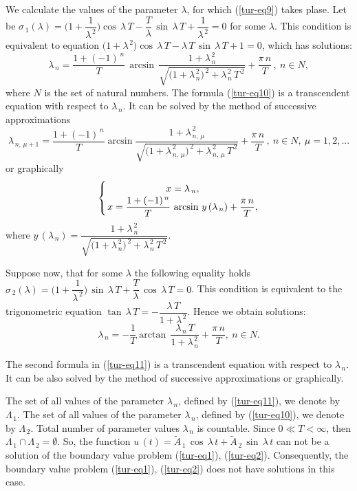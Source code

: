 ﻿\documentclass[
11pt,%
tightenlines,%
twoside,%
onecolumn,%
nofloats,%
nobibnotes,%
nofootinbib,%
superscriptaddress,%
noshowpacs,%
centertags]%
{revtex4}
\begin{document}
We calculate the values of the parameter  $\lambda$, for which (\ref{tur-eq9}) takes plase. Let be $\sigma_{\, 1 } (\lambda)=\Big(1+\dfrac{1}{\lambda^{\, 2}} \Big) \cos \, \lambda \, T- \dfrac{T}{\lambda} \, \sin \, \lambda \, T+\dfrac{1}{\lambda^{\, 2}}= 0 $ for some $\lambda$.  This condition is equivalent to equation $\big(1+\lambda^{\, 2} \big) \cos \, \lambda \, T- \lambda \, T \, \sin \, \lambda \, T+1=0$, which has solutions:
\begin{equation} \label{tur-eq10}
\lambda_{\, n}=\dfrac{1+(-1)^{\, n}}{T} \, \arcsin \, \dfrac{1+\lambda_{\, n}^{\, 2}}{\sqrt{\big( 1+\lambda_{\, n}^{\, 2} \big)^{\, 2}+\lambda_{\, n}^{\, 2} \, T^{\, 2}}}+\dfrac{\pi \, n}{T} \, , \: n \in N , 
\end{equation}
where $N$ is the set of natural numbers. The formula (\ref{tur-eq10}) is a transcendent equation with respect to  $\lambda_{\, n}$. It can be solved by the method of successive approximations  
\[
\lambda_{\, n , \, \mu+1}=\dfrac{1+(-1)^{\, n}}{T} \arcsin \dfrac{1+\lambda_{\, n , \, \mu}^{\, 2}}{\sqrt{\big( 1+\lambda_{\, n , \, \mu}^{\, 2} \big)^{\, 2}+\lambda_{\, n , \, \mu}^{\, 2} \, T^{\, 2}}}+
\dfrac{\pi \, n}{T} \, , \: n \in N , \: \mu=1 , 2 , \dots
\]
or graphically
\[
\left\{  x=\lambda_{\, n} , \atop
x=\dfrac{1+(-1)^{\, n}}{T} \, \arcsin \, y \, (\lambda_{\, n})+\dfrac{\pi \, n}{T} , \right. 
\]
where $y \, (\lambda_{\, n})=\dfrac{1+\lambda_{\, n}^{\, 2}}{\sqrt{\big( 1+\lambda_{\, n}^{\, 2} \big)^{\, 2}+\lambda_{\, n}^{\, 2} \, T^{\, 2}}}$.

Suppose now, that for some $\lambda$ the following equality holds $\sigma_{\, 2 } (\lambda)=\Big(1+\dfrac{1}{\lambda^{\, 2}} \Big) \, \sin \, \lambda \, T+\dfrac{T}{\lambda} \, \cos \, \lambda \, T= 0 $.  This condition is equivalent to the trigonometric equation $\tan \, \lambda \, T=-\dfrac{\lambda \, T}{1+\lambda^{\, 2}}$. Hence we obtain solutions:
\begin{equation} \label{tur-eq11}
\lambda_{\, n}=-\dfrac{1}{T} \arctan \, \dfrac{\lambda_{\, n} \, T}{1+\lambda_{\, n}^{\, 2}}+\dfrac{\pi \, n}{T} , \: n \in N .
\end{equation}

The second formula in (\ref{tur-eq11}) is a transcendent equation with respect to  $\lambda_{\, n}$. It can be also solved by the method of successive approximations or graphically. 

The set of all values of the parameter $\lambda_{\, n}$, defined by (\ref{tur-eq11}), we denote by $\Lambda_{\, 1}$.  The set of all values of the parameter $\lambda_{\, n}$,  defined by (\ref{tur-eq10}), we denote by $\Lambda_{\, 2}$. Total number of parameter values $\lambda_{\, n}$ is countable. Since  $0 \ll T<\infty$, then $\Lambda_{\, 1} \cap \Lambda_{\, 2}=\emptyset $. So, the function $
u \, (t)=\tilde A_{\, 1} \, \cos \, \lambda \, t+\tilde A_{\, 2} \, \sin \, \lambda \, t$ can not be a solution of the boundary value problem (\ref{tur-eq1}), (\ref{tur-eq2}). Consequently, the boundary value problem (\ref{tur-eq1}), (\ref{tur-eq2}) does not have solutions in this case. 
	
\end{document}
